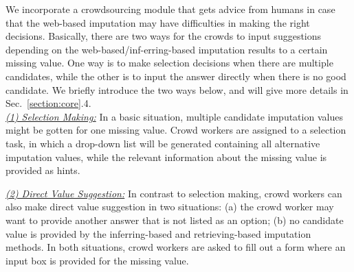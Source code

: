 \documentclass[sigconf]{acmart}
\begin{document}
We incorporate a crowdsourcing module that gets advice from humans in case that the web-based imputation may have difficulties in making the right decisions. Basically, there are two ways for the crowds to input suggestions depending on the web-based/inf-erring-based imputation results to a certain missing value. One way is to make selection decisions when there are multiple candidates, while the other is to input the answer directly when there is no good candidate. We briefly introduce the two ways below, and will give more details in Sec.~\ref{section:core}.4.\\
\noindent\underline{\it (1) Selection Making:}
In a basic situation, multiple candidate imputation values might be gotten for one missing value. Crowd workers are assigned to a selection task, in which a drop-down list will be generated containing all alternative imputation values, while the relevant information about the missing value is provided as hints. %

\noindent\underline{\it (2) Direct Value Suggestion:}
In contrast to selection making, crowd workers can also make direct value suggestion in two situations: (a) the crowd worker may want to provide another answer that is not listed as an option; (b) no candidate value is provided by the inferring-based and retrieving-based imputation methods. In both situations, crowd workers are asked to fill out a form where an input box is provided for the missing value. %


%


\vspace{-10pt}
\end{document}
